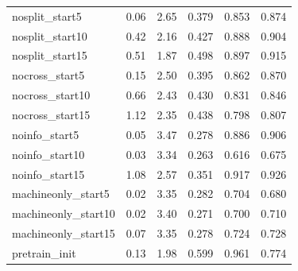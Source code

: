 \begin{table}[p]
\begin{tabularx}{\textwidth}{lXXXXX}
nosplit\_start5 & 0.06 & 2.65 & 0.379 & 0.853 & 0.874 \\
nosplit\_start10 & 0.42 & 2.16 & 0.427 & 0.888 & 0.904 \\
nosplit\_start15 & 0.51 & 1.87 & 0.498 & 0.897 & 0.915 \\
nocross\_start5 & 0.15 & 2.50 & 0.395 & 0.862 & 0.870 \\
nocross\_start10 & 0.66 & 2.43 & 0.430 & 0.831 & 0.846 \\
nocross\_start15 & 1.12 & 2.35 & 0.438 & 0.798 & 0.807 \\
noinfo\_start5 & 0.05 & 3.47 & 0.278 & 0.886 & 0.906 \\
noinfo\_start10 & 0.03 & 3.34 & 0.263 & 0.616 & 0.675 \\
noinfo\_start15 & 1.08 & 2.57 & 0.351 & 0.917 & 0.926 \\
machineonly\_start5 & 0.02 & 3.35 & 0.282 & 0.704 & 0.680 \\
machineonly\_start10 & 0.02 & 3.40 & 0.271 & 0.700 & 0.710 \\
machineonly\_start15 & 0.07 & 3.35 & 0.278 & 0.724 & 0.728 \\
pretrain\_init & 0.13 & 1.98 & 0.599 & 0.961 & 0.774 \\
\bottomrule
\end{tabularx}
\end{table}

